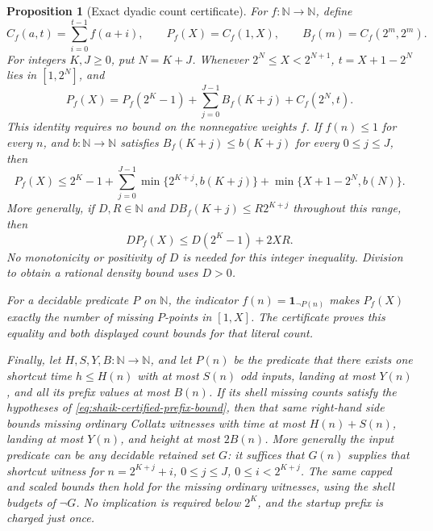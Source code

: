 \documentclass[11pt]{article}
\newtheorem{proposition}{Proposition}
\theoremstyle{remark}\newtheorem{remark}[proposition]{Remark}
\newcommand{\NN}{\mathbb N}
\begin{document}
\begin{proposition}[Exact dyadic count certificate]
\label{prop:shaik-dyadic-certificate}
For \(f:\NN\to\NN\), define
\[
 C_f(a,t)=\sum_{i=0}^{t-1}f(a+i),\qquad
 P_f(X)=C_f(1,X),\qquad B_f(m)=C_f(2^m,2^m).
\]
For integers \(K,J\ge0\), put \(N=K+J\). Whenever
\(2^N\le X<2^{N+1}\), \(t=X+1-2^N\) lies in \([1,2^N]\), and
\begin{equation}\label{eq:shaik-certified-prefix-partition}
 P_f(X)=P_f(2^K-1)+\sum_{j=0}^{J-1}B_f(K+j)+C_f(2^N,t).
\end{equation}
This identity requires no bound on the nonnegative weights \(f\).
If \(f(n)\le1\) for every \(n\), and \(b:\NN\to\NN\) satisfies
\(B_f(K+j)\le b(K+j)\) for every \(0\le j\le J\), then
\begin{equation}\label{eq:shaik-certified-prefix-bound}
 P_f(X)\le 2^K-1+
 \sum_{j=0}^{J-1}\min\{2^{K+j},b(K+j)\}
             +\min\{X+1-2^N,b(N)\}.
\end{equation}
More generally, if \(D,R\in\NN\) and
\(D B_f(K+j)\le R2^{K+j}\) throughout this range, then
\begin{equation}\label{eq:shaik-certified-scaled-tail}
 D P_f(X)\le D(2^K-1)+2XR .
\end{equation}
No monotonicity or positivity of \(D\) is needed for this integer
inequality. Division to obtain a rational density bound uses \(D>0\).

For a decidable predicate \(P\) on \(\NN\), the indicator
\(f(n)=\boldsymbol1_{\neg P(n)}\) makes \(P_f(X)\) exactly the
number of missing \(P\)-points in \([1,X]\). The certificate proves
this equality and both displayed count bounds for that literal count.

Finally, let \(H,S,Y,B:\NN\to\NN\), and let \(P(n)\) be the predicate
that there exists one shortcut time \(h\le H(n)\) with at most \(S(n)\)
odd inputs, landing at most \(Y(n)\), and all its prefix values at
most \(B(n)\). If its shell missing counts satisfy the hypotheses of
\eqref{eq:shaik-certified-prefix-bound}, then that same right-hand
side bounds missing ordinary Collatz witnesses with time at most
\(H(n)+S(n)\), landing at most \(Y(n)\), and height at most \(2B(n)\).
More generally the input predicate can be any decidable retained set
\(G\): it suffices that \(G(n)\) supplies that shortcut witness for
\(n=2^{K+j}+i\), \(0\le j\le J\), \(0\le i<2^{K+j}\).
The same capped and scaled bounds then hold for the missing ordinary
witnesses, using the shell budgets of \(\neg G\). No implication is
required below \(2^K\), and the startup prefix is charged just once.
\end{proposition}
\end{document}
